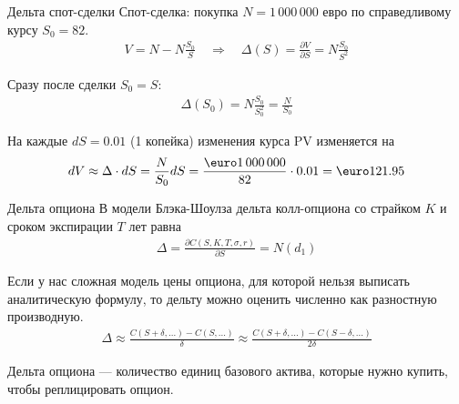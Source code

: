 \documentclass{beamer}
\renewcommand{\EUR}[1]{\textup{\euro}#1}
\begin{document}
\begin{frame}{Дельта спот-сделки}
\justify
Спот-сделка: покупка $N=1\,000\,000$ евро по справедливому курсу $S_0=82$.
\begin{align*}
V = N - N\frac{S_0}{S} \quad \Rightarrow \quad \Delta(S) = \frac{\partial V}{\partial S} = N\frac{S_0}{S^2}
\end{align*}

\justify
Сразу после сделки $S_0=S$:
\begin{align*}
\Delta(S_0) = N\frac{S_0}{S_0^2} = \frac{N}{S_0}
\end{align*}

\justify
На каждые $dS=0.01$ (1 копейка) изменения курса PV изменяется на
\begin{align*}
dV \approx \Delta \cdot dS = \frac{N}{S_0}dS = \frac{\EUR{1\,000\,000}}{82}\cdot 0.01 = \EUR{121.95}
\end{align*}
\end{frame}



\begin{frame}{Дельта опциона}
\justify
В модели Блэка-Шоулза дельта колл-опциона со страйком $K$ и сроком экспирации $T$ лет равна
\begin{align*}
\Delta = \frac{\partial C(S, K, T, \sigma, r)}{\partial S} = N(d_1)
\end{align*}

\justify
Если у нас сложная модель цены опциона, для которой нельзя выписать аналитическую формулу, то дельту можно оценить численно как разностную производную.
\begin{align*}
\Delta \approx \frac{C(S+\delta,...) - C(S,...)}{\delta} \approx \frac{C(S+\delta,...) - C(S-\delta,...)}{2\delta}
\end{align*}

\justify
Дельта опциона --- количество единиц базового актива, которые нужно купить, чтобы реплицировать опцион.
\end{frame}
\end{document}
